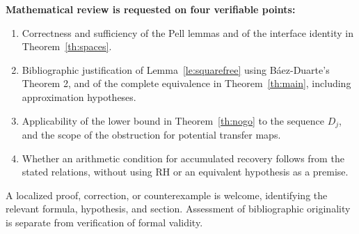 \documentclass[11pt,a4paper]{article}
\theoremstyle{mine}
\theoremstyle{definition}
\begin{document}
\textbf{Mathematical review is requested on four verifiable points:}
\begin{enumerate}
\item Correctness and sufficiency of the Pell lemmas and of the interface identity in Theorem~\ref{th:spaces}.
\item Bibliographic justification of Lemma~\ref{le:squarefree} using B\'aez-Duarte's Theorem 2, and of the complete equivalence in Theorem~\ref{th:main}, including approximation hypotheses.
\item Applicability of the lower bound in Theorem~\ref{th:nogo} to the sequence $D_j$, and the scope of the obstruction for potential transfer maps.
\item Whether an arithmetic condition for accumulated recovery follows from the stated relations, without using RH or an equivalent hypothesis as a premise.
\end{enumerate}

A localized proof, correction, or counterexample is welcome, identifying the relevant formula, hypothesis, and section. Assessment of bibliographic originality is separate from verification of formal validity.
\end{document}
